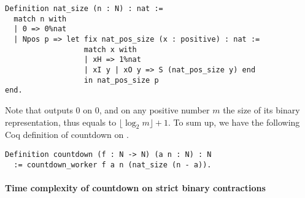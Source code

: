 \begin{lstlisting}
Definition nat_size (n : N) : nat :=
  match n with
  | 0 => 0%nat
  | Npos p => let fix nat_pos_size (x : positive) : nat :=
                  match x with
                  | xH => 1%nat
                  | xI y | xO y => S (nat_pos_size y) end
                  in nat_pos_size p
end.
\end{lstlisting}
Note that  outputs $0$ on $0$, and on any positive number $m$ the size of its binary representation, thus equals to $\lfloor \log_2 m \rfloor + 1$. To sum up, we have the following Coq definition of countdown on .

\begin{lstlisting}
Definition countdown (f : N -> N) (a n : N) : N
  := countdown_worker f a n (nat_size (n - a)).
\end{lstlisting}

\paragraph*{Time complexity of countdown on strict binary contractions}

